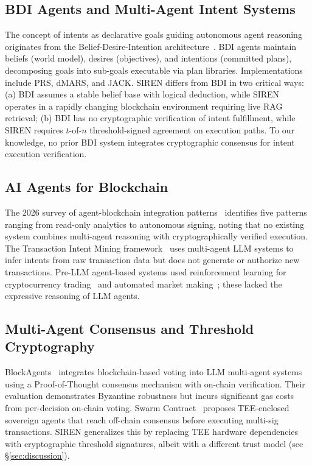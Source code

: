 \documentclass[11pt]{article}
\begin{document}
\subsection{BDI Agents and Multi-Agent Intent Systems}

The concept of intents as declarative goals guiding autonomous agent reasoning originates from the Belief-Desire-Intention architecture~\cite{bratman1987, rao_georgeff1991}. BDI agents maintain beliefs (world model), desires (objectives), and intentions (committed plans), decomposing goals into sub-goals executable via plan libraries. Implementations include PRS, dMARS, and JACK. SIREN differs from BDI in two critical ways: (a) BDI assumes a stable belief base with logical deduction, while SIREN operates in a rapidly changing blockchain environment requiring live RAG retrieval; (b) BDI has no cryptographic verification of intent fulfillment, while SIREN requires $t$-of-$n$ threshold-signed agreement on execution paths. To our knowledge, no prior BDI system integrates cryptographic consensus for intent execution verification.

\subsection{AI Agents for Blockchain}

The 2026 survey of agent-blockchain integration patterns~\cite{agent_blockchain_survey} identifies five patterns ranging from read-only analytics to autonomous signing, noting that no existing system combines multi-agent reasoning with cryptographically verified execution. The Transaction Intent Mining framework~\cite{tim_framework} uses multi-agent LLM systems to infer intents from raw transaction data but does not generate or authorize new transactions. Pre-LLM agent-based systems used reinforcement learning for cryptocurrency trading~\cite{jiang_liang2017} and automated market making~\cite{spooner2018}; these lacked the expressive reasoning of LLM agents.

\subsection{Multi-Agent Consensus and Threshold Cryptography}

BlockAgents~\cite{blockagents} integrates blockchain-based voting into LLM multi-agent systems using a Proof-of-Thought consensus mechanism with on-chain verification. Their evaluation demonstrates Byzantine robustness but incurs significant gas costs from per-decision on-chain voting. Swarm Contract~\cite{swarm_contract} proposes TEE-enclosed sovereign agents that reach off-chain consensus before executing multi-sig transactions. SIREN generalizes this by replacing TEE hardware dependencies with cryptographic threshold signatures, albeit with a different trust model (see \S\ref{sec:discussion}).
\end{document}
